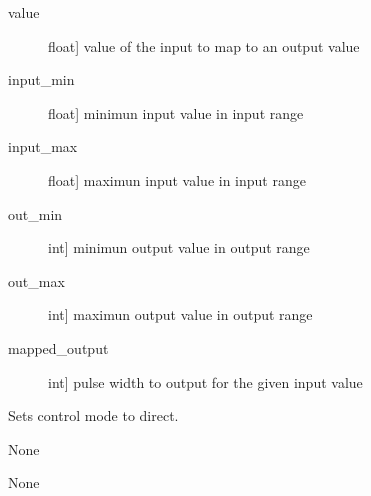 \documentclass[letterpaper,10pt,english]{sphinxmanual}
\begin{document}
\begin{fulllineitems}
\begin{fulllineitems}
\sphinxAtStartPar
{}
\begin{description}
\item[{value}] \leavevmode{[}float{]}
\sphinxAtStartPar
value of the input to map to an output value

\item[{input\_min}] \leavevmode{[}float{]}
\sphinxAtStartPar
minimun input value in input range

\item[{input\_max}] \leavevmode{[}float{]}
\sphinxAtStartPar
maximun input value in input range

\item[{out\_min}] \leavevmode{[}int{]}
\sphinxAtStartPar
minimun output value in output range

\item[{out\_max}] \leavevmode{[}int{]}
\sphinxAtStartPar
maximun output value in output range

\end{description}

\sphinxAtStartPar
{}
\begin{description}
\item[{mapped\_output}] \leavevmode{[}int{]}
\sphinxAtStartPar
pulse width to output for the given input value

\end{description}

\end{fulllineitems}


\begin{fulllineitems}
\label{\detokenize{base:MultiInputOutputObject.MultiInputOutputObject.set_control_direct}}
\sphinxAtStartPar
Sets control mode to direct.

\sphinxAtStartPar
{}

\sphinxAtStartPar
None

\sphinxAtStartPar
{}

\sphinxAtStartPar
None

\end{fulllineitems}



\end{fulllineitems}
\end{document}
